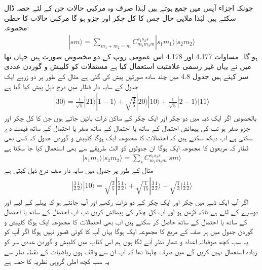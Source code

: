  چونکہ  اجزاء آپس میں جمع ہوتے ہیں لہٰذا صرف وہ مرکبی حالات جن کے لئے 
حصہ ڈال سکتے ہیں لہٰذا ملاپی حال 
جس کا کل چکر  اور  جزو   ہو گا مرکبی حالات  کا خطی مجموعہ:
\begin{align}
|sm\rangle=\sum_{m_1+m_2=m}C_{m_1m_2m}^{s_1s_2s} |s_1m_1\rangle |s_2 m_2\rangle
\end{align}
ہو گا۔ مساوات 4.177 اور 4.178 اس عمومی روپ کے دو مخصوص صورت ہیں جہاں  تھا میں نے یہاں غیر رسمی علامتیت   استعمال کیا ہے مستقلات  کو كليبش و گوردن عددی سر کہتے ہیں جدول 4.8 میں چند سادہ صورتیں پیش کی گئی ہے مثال کے طور پر دو زربے ایک جدول کے سایہ دار قطار میں درج ذیل پیش کیا گیا ہے 
\begin{align*}
| 3 0 \rangle = \frac{1}{\sqrt{5}} | 2 1 \rangle | 1 - 1 \rangle + \sqrt{\frac{3}{5}} | 2 0 \rangle | 1 0 \rangle + \frac{1}{\sqrt{5}} | 2 - 1 \rangle | 1 1 \rangle
\end{align*}
بالخصوص اگر ایک ڈبہ میں دو چکر اور ایک چکر کے ساکن ذرات بائیں جاتے ہوں جن کا کل چکر  اور  جزو صفر ہو تب  کی پیمائش  احتمال کے ساتھ  یا  احتمال کے ساتھ صفر یا  احتمال کے ساتھ  قیمت دے سکتی ہے اب دیکھ سکتے ہیں کہ احتمالات کا مجموعہ ایک ہوگا كليبش و گوردن جدول کہ کسی بھی قطار کہ مربعون کا مجموعہ ایک ہوگا ان جدولوں کو الٹ طریقے سے بھی استعمال کیا جا سکتا ہے 
\begin{align} 
| s_1 m_1 \rangle | s_2 m_2 \rangle = \sum_s C_{m_1 m_2 m}^{s_1 s_2 s} | s m \rangle
\end{align}
مثال کے طور پر  جدول میں سایہ دار صف درج ذیل کہتی ہے 
\begin{align*}
| \frac{3}{2} \frac{1}{2} \rangle | 1 0 \rangle = \sqrt{\frac{3}{5}} | \frac{5}{2} \frac{1}{2} \rangle + \sqrt{\frac{1}{15}} | \frac{3}{2} \frac{1}{2} \rangle - \sqrt{\frac{1}{3}} | \frac{1}{2} \frac{1}{2} \rangle
\end{align*}
اگر آپ ایک ڈبے میں  چکر اور ایک چکر کے دو ذرات رکھے اور آپ جانتے ہو کہ پہلے کے لیے  اور دوسرے کے لئے  ہے تاکہ  لازمن  ہو اور آپ کل چکر  کی پیمائش کریں تب آپ  احتمال کے ساتھ  یا  احتمال کے ساتھ  یا  احتمال کے ساتھ  حاصل کر سکتے ہیں اب بھی احتمالات کا مجموعہ ایک ہوگا كليبش و گوردن جدول میں ہر صف کے مربع کا مجموعہ ایک ہوگا یہاں آپ کا کوئی قصور نہیں ہوگا اگر آپ کو یہ سب کچھ صوفیانہ اعداد و شمار نظر آنے لگا ہوں ہم اس کتاب میں كليبش و گوردن عددی سر کو زیادہ استعمال نہیں کریں گے میں صرف چاہتا تھا کہ آپ ان سے واقف ہوں ریاضیات کے نقطہ نظر سے یہ سب کچھ املی گروہی نظریہ کا حصہ ہے 
